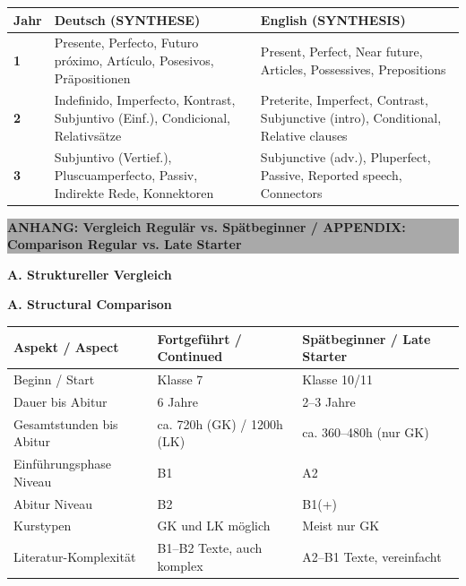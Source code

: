 \documentclass[10pt,a4paper]{article}
\newcommand{\secbil}[2]{%
\vspace{6pt}
\noindent\colorbox{spaet}{\parbox{0.48\textwidth}{\color{white}\bfseries\small #1}}%
\hfill%
\colorbox{english}{\parbox{0.48\textwidth}{\color{white}\bfseries\small #2}}
\vspace{3pt}
}
\begin{document}
\vspace{2mm}

\begin{center}
\scriptsize
\begin{tabular}{|l|p{5cm}|p{5cm}|}
\hline
\rowcolor{lightgray}
\textbf{Jahr} & \textbf{Deutsch (SYNTHESE)} & \textbf{English (SYNTHESIS)} \\
\hline
\textbf{1} & Presente, Perfecto, Futuro próximo, Artículo, Posesivos, Präpositionen & Present, Perfect, Near future, Articles, Possessives, Prepositions \\
\hline
\textbf{2} & Indefinido, Imperfecto, Kontrast, Subjuntivo (Einf.), Condicional, Relativsätze & Preterite, Imperfect, Contrast, Subjunctive (intro), Conditional, Relative clauses \\
\hline
\textbf{3} & Subjuntivo (Vertief.), Pluscuamperfecto, Passiv, Indirekte Rede, Konnektoren & Subjunctive (adv.), Pluperfect, Passive, Reported speech, Connectors \\
\hline
\end{tabular}
\end{center}


\newpage

\begin{center}
\colorbox{darkgray}{\parbox{0.95\textwidth}{\centering\color{white}\Large\bfseries\vspace{4pt}
ANHANG: Vergleich Regulär vs. Spätbeginner / APPENDIX: Comparison Regular vs. Late Starter
\vspace{4pt}}}
\end{center}

\vspace{4mm}

\secbil{A. Struktureller Vergleich}{A. Structural Comparison}

\vspace{2mm}

\begin{center}
\small
\begin{tabular}{|p{3.5cm}|p{4.5cm}|p{4.5cm}|}
\hline
\rowcolor{lightgray}
\textbf{Aspekt / Aspect} & \textbf{Fortgeführt / Continued} & \textbf{Spätbeginner / Late Starter} \\
\hline
Beginn / Start & Klasse 7 & Klasse 10/11 \\
\hline
Dauer bis Abitur & 6 Jahre & 2--3 Jahre \\
\hline
Gesamtstunden bis Abitur & ca. 720h (GK) / 1200h (LK) & ca. 360--480h (nur GK) \\
\hline
Einführungsphase Niveau & B1 & A2 \\
\hline
Abitur Niveau & B2 & B1(+) \\
\hline
Kurstypen & GK und LK möglich & Meist nur GK \\
\hline
Literatur-Komplexität & B1--B2 Texte, auch komplex & A2--B1 Texte, vereinfacht \\
\hline
\end{tabular}
\end{center}
\end{document}
